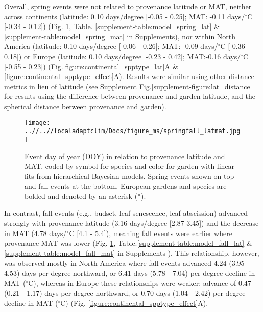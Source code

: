 \documentclass{article}
\begin{document}
Overall, spring events were not related to provenance latitude or MAT, neither across continents (latitude: 0.10 days/degree [-0.05 - 0.25]; MAT: -0.11 days/$^{\circ}$C [-0.34 - 0.12]) (Fig. \ref{figure:springfall_latmat}, Table. \ref{supplement-table:model_spring_lat} \& \ref{supplement-table:model_spring_mat} in Supplements), nor within North America (latitude: 0.10 days/degree [-0.06 - 0.26]; MAT: -0.09 days/$^{\circ}$C [-0.36 - 0.18]) or Europe (latitude: 0.10 days/degree [-0.23 - 0.42]; MAT:-0.16 days/$^{\circ}$C [-0.55 - 0.23]) (Fig.\ref{figure:continental_spptype_lat}A \& \ref{figure:continental_spptype_effect}A). Results were similar using other distance metrics in lieu of latitude (see Supplement Fig.\ref{supplement-figure:lat_distance} for results using the difference between provenance and garden latitude, and the spherical distance between provenance and garden).

\begin{figure}[!h] 
    \centering
 \texttt{[image: ..//..//localadaptclim/Docs/figure\_ms/springfall\_latmat.jpg]}
    \caption{Event day of year (DOY) in relation to provenance latitude and MAT, coded by symbol for species and color for garden with linear fits from hierarchical Bayesian models. Spring events shown on top and fall events at the bottom. European gardens and species are bolded and denoted by an asterisk (*). } 
    \label{figure:springfall_latmat}
\end{figure}


In contrast, fall events (e.g., budset, leaf senescence, leaf abscission) advanced strongly with provenance latitude (3.16 days/degree [2.87-3.45]) and the decrease in MAT (4.78 days/$^{\circ}$C [4.1 - 5.4]), meaning fall events were earlier where provenance MAT was lower (Fig. \ref{figure:springfall_latmat}, Table.\ref{supplement-table:model_fall_lat} \& \ref{supplement-table:model_fall_mat} in Supplements ). This relationship, however, was observed mostly in North America where fall events advanced 4.24 (3.95 - 4.53) days per degree northward, or 6.41 days (5.78 - 7.04) per degree decline in MAT ($^{\circ}$C), whereas in Europe these relationships were weaker: advance of 0.47 (0.21 - 1.17) days per degree northward, or 0.70 days (1.04 - 2.42) per degree decline in MAT ($^{\circ}$C) (Fig. \ref{figure:continental_spptype_effect}A).
\end{document}
